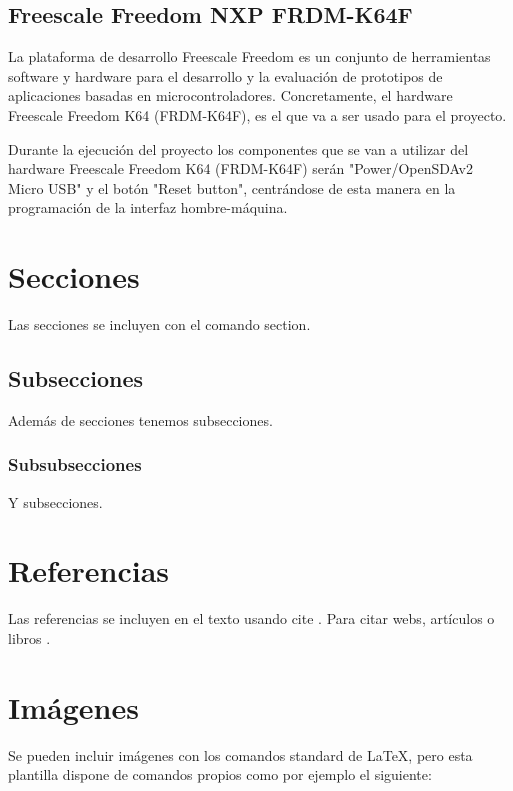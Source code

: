 \subsection{Freescale Freedom NXP FRDM-K64F}

La plataforma de desarrollo Freescale Freedom es un conjunto de herramientas software y hardware para el desarrollo y la evaluación de prototipos de aplicaciones basadas en microcontroladores. Concretamente, el hardware Freescale Freedom K64 (FRDM-K64F), es el que va a ser usado para el proyecto.


Durante la ejecución del proyecto los componentes que se van a utilizar del hardware Freescale Freedom K64 (FRDM-K64F) serán "Power/OpenSDAv2 Micro USB" y el botón "Reset button", centrándose de esta manera en la programación de la interfaz hombre-máquina.



\section{Secciones}

Las secciones se incluyen con el comando section.

\subsection{Subsecciones}

Además de secciones tenemos subsecciones.

\subsubsection{Subsubsecciones}

Y subsecciones. 


\section{Referencias}

Las referencias se incluyen en el texto usando cite \cite{wiki:latex}. Para citar webs, artículos o libros \cite{koza92}.


\section{Imágenes}

Se pueden incluir imágenes con los comandos standard de \LaTeX, pero esta plantilla dispone de comandos propios como por ejemplo el siguiente:

